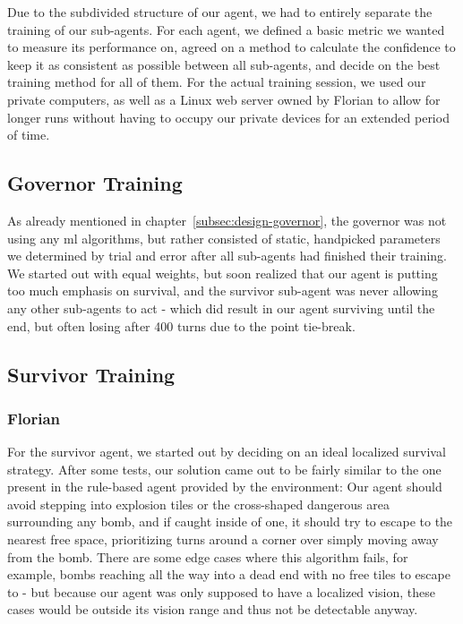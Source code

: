 Due to the subdivided structure of our agent, we had to entirely separate the training of our sub-agents.
For each agent, we defined a basic metric we wanted to measure its performance on, agreed on a method to calculate the
confidence to keep it as consistent as possible between all sub-agents, and decide on the best training method for all
of them.
For the actual training session, we used our private computers, as well as a Linux web server owned by Florian to allow
for longer runs without having to occupy our private devices for an extended period of time.

\subsection{Governor Training}
\label{subsec:training-governor}
As already mentioned in chapter~\ref{subsec:design-governor}, the governor was not using any \gls{ml} algorithms, but
rather consisted of static, handpicked parameters we determined by trial and error after all sub-agents had finished
their training.
We started out with equal weights, but soon realized that our agent is putting too much emphasis on survival, and the
survivor sub-agent was never allowing any other sub-agents to act - which did result in our agent surviving until the
end, but often losing after 400 turns due to the point tie-break.

\subsection{Survivor Training}
\subsubsection*{Florian}
\label{subsec:training-survivor}
For the survivor agent, we started out by deciding on an ideal localized survival strategy.
After some tests, our solution came out to be fairly similar to the one present in the rule-based agent provided by the
environment:
Our agent should avoid stepping into explosion tiles or the cross-shaped dangerous area surrounding any bomb, and if
caught inside of one, it should try to escape to the nearest free space, prioritizing turns around a corner over simply
moving away from the bomb.
There are some edge cases where this algorithm fails, for example, bombs reaching all the way into a dead end with no
free tiles to escape to - but because our agent was only supposed to have a localized vision, these cases would be outside
its vision range and thus not be detectable anyway.


